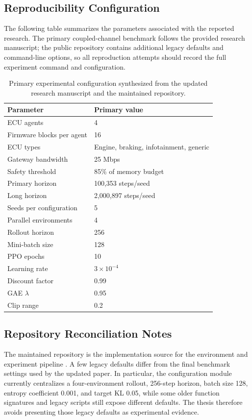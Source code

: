 \documentclass{iutbscthesis}
\begin{document}
\begin{appendices}

\chapter{Reproducibility Configuration}

The following table summarizes the parameters associated with the reported research. The primary coupled-channel benchmark follows the provided research manuscript; the public repository contains additional legacy defaults and command-line options, so all reproduction attempts should record the full experiment command and configuration.

\begin{table}[H]
\centering
\small
\begin{tabular}{ll}
\toprule
Parameter & Primary value\\
\midrule
ECU agents & 4\\
Firmware blocks per agent & 16\\
ECU types & Engine, braking, infotainment, generic\\
Gateway bandwidth & 25 Mbps\\
Safety threshold & 85\% of memory budget\\
Primary horizon & 100,353 steps/seed\\
Long horizon & 2,000,897 steps/seed\\
Seeds per configuration & 5\\
Parallel environments & 4\\
Rollout horizon & 256\\
Mini-batch size & 128\\
PPO epochs & 10\\
Learning rate & $3\times10^{-4}$\\
Discount factor & 0.99\\
GAE $\lambda$ & 0.95\\
Clip range & 0.2\\
\bottomrule
\end{tabular}
\caption{Primary experimental configuration synthesized from the updated research manuscript and the maintained repository.}
\label{tab:repro}
\end{table}

\section{Repository Reconciliation Notes}
The maintained repository is the implementation source for the environment and experiment pipeline \parencite{ma_reles_ota_repo}. A few legacy defaults differ from the final benchmark settings used by the updated paper. In particular, the configuration module currently centralizes a four-environment rollout, 256-step horizon, batch size 128, entropy coefficient 0.001, and target KL 0.05, while some older function signatures and legacy scripts still expose different defaults. The thesis therefore avoids presenting those legacy defaults as experimental evidence.


\end{appendices}
\end{document}
